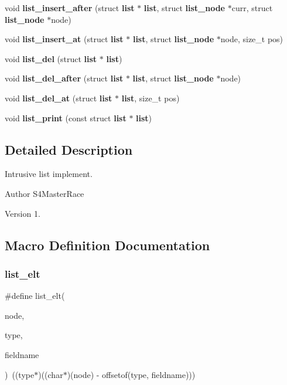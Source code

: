 \begin{DoxyCompactItemize}
\item 
void \textbf{ list\+\_\+insert\+\_\+after} (struct \textbf{ list} $\ast$\textbf{ list}, struct \textbf{ list\+\_\+node} $\ast$curr, struct \textbf{ list\+\_\+node} $\ast$node)
\item 
void \textbf{ list\+\_\+insert\+\_\+at} (struct \textbf{ list} $\ast$\textbf{ list}, struct \textbf{ list\+\_\+node} $\ast$node, size\+\_\+t pos)
\item 
void \textbf{ list\+\_\+del} (struct \textbf{ list} $\ast$\textbf{ list})
\item 
void \textbf{ list\+\_\+del\+\_\+after} (struct \textbf{ list} $\ast$\textbf{ list}, struct \textbf{ list\+\_\+node} $\ast$node)
\item 
void \textbf{ list\+\_\+del\+\_\+at} (struct \textbf{ list} $\ast$\textbf{ list}, size\+\_\+t pos)
\item 
void \textbf{ list\+\_\+print} (const struct \textbf{ list} $\ast$\textbf{ list})
\end{DoxyCompactItemize}


\subsection{Detailed Description}
Intrusive list implement. 

\begin{DoxyAuthor}{Author}
S4\+Master\+Race 
\end{DoxyAuthor}
\begin{DoxyVersion}{Version}
1. 
\end{DoxyVersion}


\subsection{Macro Definition Documentation}
\mbox{\label{list_8h_a12e153fb4ee7d1a550fa57a733629eac}} 
\subsubsection{list\+\_\+elt}
{\footnotesize\ttfamily \#define list\+\_\+elt(\begin{DoxyParamCaption}\item[{}]{node,  }\item[{}]{type,  }\item[{}]{fieldname }\end{DoxyParamCaption})~((type$\ast$)((char$\ast$)(node) -\/ offsetof(type, fieldname)))}

